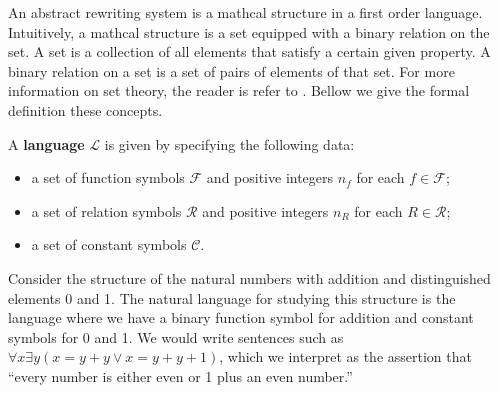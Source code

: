 


An abstract rewriting system is a mathcal structure in a first order language.
Intuitively, a mathcal structure is a set equipped with a binary relation on the set. 
A set is a collection of all elements that satisfy a certain given property. 
A binary relation on a set is a set of pairs of elements of that set. 
For more information on set theory, the reader is refer to \cite{jech2006set}. Bellow we give the formal definition these concepts.
  
\begin{definition}
  A \textbf{language} \( \mathcal{L} \) is given by specifying the following data:
  \begin{itemize}
      \item  a set of function symbols \( \mathcal{F} \) and positive integers \( n_f \) for each \( f \in \mathcal{F} \);
      \item  a set of relation symbols \( \mathcal{R} \) and positive integers \( n_R \) for each \( R \in \mathcal{R} \);
      \item  a set of constant symbols \( \mathcal{C} \).
  \end{itemize}
\end{definition}

\begin{example}
  Consider the structure of the natural numbers with addition and distinguished elements 0 and 1. The natural language for studying this structure is the language where we have a binary function symbol for addition and constant symbols for 0 and 1. We would write sentences such as $\forall x \exists y (x = y + y \lor x = y + y +1)$, which we interpret as the assertion that “every number is either even or 1 plus an even number.”
\end{example}

